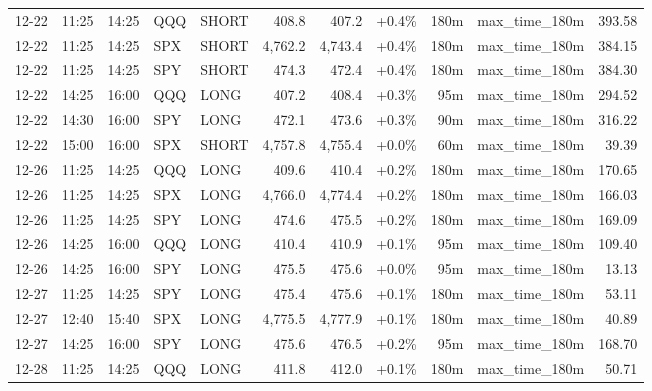 \documentclass[11pt,a4paper,twoside]{article}
\begin{document}
\begin{center}
\begin{longtable}{>{\color{txtmain}}l l l l l r r r r >{\color{txtmain}}l r}
12-22 & 11:25 & 14:25 & QQQ & SHORT & 408.8 & 407.2 & \textcolor{wingreen}{+0.4\%} & 180m & max\_time\_180m & \textcolor{wingreen}{393.58} \\
12-22 & 11:25 & 14:25 & SPX & SHORT & 4,762.2 & 4,743.4 & \textcolor{wingreen}{+0.4\%} & 180m & max\_time\_180m & \textcolor{wingreen}{384.15} \\
12-22 & 11:25 & 14:25 & SPY & SHORT & 474.3 & 472.4 & \textcolor{wingreen}{+0.4\%} & 180m & max\_time\_180m & \textcolor{wingreen}{384.30} \\
12-22 & 14:25 & 16:00 & QQQ & LONG & 407.2 & 408.4 & \textcolor{wingreen}{+0.3\%} & 95m & max\_time\_180m & \textcolor{wingreen}{294.52} \\
12-22 & 14:30 & 16:00 & SPY & LONG & 472.1 & 473.6 & \textcolor{wingreen}{+0.3\%} & 90m & max\_time\_180m & \textcolor{wingreen}{316.22} \\
12-22 & 15:00 & 16:00 & SPX & SHORT & 4,757.8 & 4,755.4 & \textcolor{wingreen}{+0.0\%} & 60m & max\_time\_180m & \textcolor{wingreen}{39.39} \\
12-26 & 11:25 & 14:25 & QQQ & LONG & 409.6 & 410.4 & \textcolor{wingreen}{+0.2\%} & 180m & max\_time\_180m & \textcolor{wingreen}{170.65} \\
12-26 & 11:25 & 14:25 & SPX & LONG & 4,766.0 & 4,774.4 & \textcolor{wingreen}{+0.2\%} & 180m & max\_time\_180m & \textcolor{wingreen}{166.03} \\
12-26 & 11:25 & 14:25 & SPY & LONG & 474.6 & 475.5 & \textcolor{wingreen}{+0.2\%} & 180m & max\_time\_180m & \textcolor{wingreen}{169.09} \\
12-26 & 14:25 & 16:00 & QQQ & LONG & 410.4 & 410.9 & \textcolor{wingreen}{+0.1\%} & 95m & max\_time\_180m & \textcolor{wingreen}{109.40} \\
12-26 & 14:25 & 16:00 & SPY & LONG & 475.5 & 475.6 & \textcolor{wingreen}{+0.0\%} & 95m & max\_time\_180m & \textcolor{wingreen}{13.13} \\
12-27 & 11:25 & 14:25 & SPY & LONG & 475.4 & 475.6 & \textcolor{wingreen}{+0.1\%} & 180m & max\_time\_180m & \textcolor{wingreen}{53.11} \\
12-27 & 12:40 & 15:40 & SPX & LONG & 4,775.5 & 4,777.9 & \textcolor{wingreen}{+0.1\%} & 180m & max\_time\_180m & \textcolor{wingreen}{40.89} \\
12-27 & 14:25 & 16:00 & SPY & LONG & 475.6 & 476.5 & \textcolor{wingreen}{+0.2\%} & 95m & max\_time\_180m & \textcolor{wingreen}{168.70} \\
12-28 & 11:25 & 14:25 & QQQ & LONG & 411.8 & 412.0 & \textcolor{wingreen}{+0.1\%} & 180m & max\_time\_180m & \textcolor{wingreen}{50.71} \\

\end{longtable}
\end{center}
\end{document}
